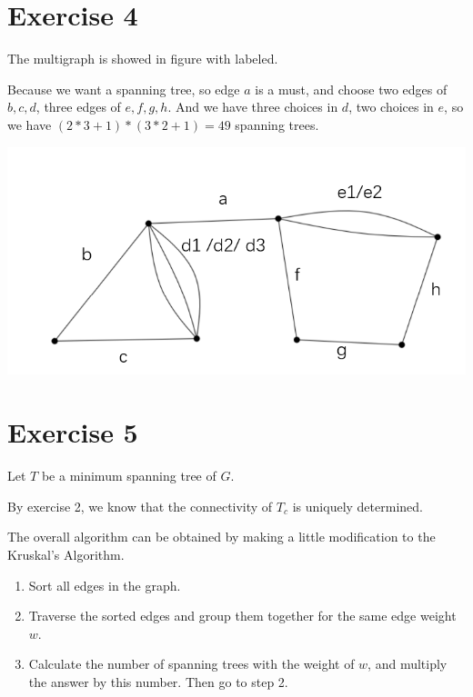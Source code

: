 \documentclass[
]{article}
\begin{document}
\hypertarget{exercise-4}{%
\section{Exercise 4}\label{exercise-4}}

The multigraph is showed in figure with labeled.

Because we want a spanning tree, so edge \(a\) is a must, and choose two
edges of \(b,c,d\), three edges of \(e,f,g,h\). And we have three
choices in \(d\), two choices in \(e\), so we have
\((2*3+1)*(3*2+1)=49\) spanning trees.

\includegraphics{3.ex.4.png}

\hypertarget{exercise-5}{%
\section{Exercise 5}\label{exercise-5}}

Let \(T\) be a minimum spanning tree of \(G\).

By exercise 2, we know that the connectivity of \(T_c\) is uniquely
determined.

The overall algorithm can be obtained by making a little modification to
the Kruskal's Algorithm.

\begin{enumerate}
\def\labelenumi{\arabic{enumi}.}
\item
  Sort all edges in the graph.
\item
  Traverse the sorted edges and group them together for the same edge
  weight \(w\).
\item
  Calculate the number of spanning trees with the weight of \(w\), and
  multiply the answer by this number. Then go to step 2.
\end{enumerate}
\end{document}
